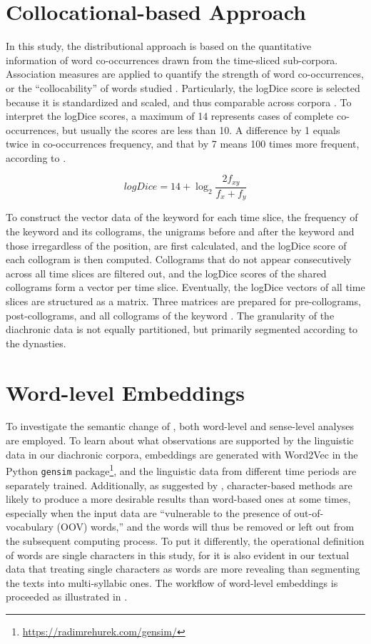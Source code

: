 \section{Collocational-based Approach}
In this study, the distributional approach is based on the quantitative information of word co-occurrences drawn from the time-sliced sub-corpora. Association measures are applied to quantify the strength of word co-occurrences, or the ``collocability'' of words studied \parencite{gablasova2017collocations}. Particularly, the logDice score is selected because it is standardized and scaled, and thus comparable across corpora \parencite{rychly2008lexicographer,gablasova2017collocations}. To interpret the logDice scores, a maximum of 14 represents cases of complete co-occurrences, but usually the scores are less than 10. A difference by 1 equals twice in co-occurrences frequency, and that by 7 means 100 times more frequent, according to .

\begin{equation}
  logDice = 14 + \log_{2}{\frac{2f_{xy}}{f_x + f_y}}
  \label{equ:logDice}
\end{equation}

To construct the vector data of the keyword \jia for each time slice, the frequency of the keyword and its collograms, the unigrams before and after the keyword and those irregardless of the position, are first calculated, and the logDice score of each collogram is then computed. Collograms that do not appear consecutively across all time slices are filtered out, and the logDice scores of the shared collograms form a vector per time slice. Eventually, the logDice vectors of all time slices are structured as a matrix. Three matrices are prepared for pre-collograms, post-collograms, and all collograms of the keyword \jia\rspace. The granularity of the diachronic data is not equally partitioned, but primarily segmented according to the dynasties.

\section{Word-level Embeddings}
To investigate the semantic change of \jia\rspace, both word-level and sense-level analyses are employed. To learn about what observations are supported by the linguistic data in our diachronic corpora, embeddings are generated with Word2Vec in the Python \texttt{gensim} package\footnote{\url{https://radimrehurek.com/gensim/}}, and the linguistic data from different time periods are separately trained. Additionally, as suggested by \textcite{li2019word}, character-based methods are likely to produce a more desirable results than word-based ones at some times, especially when the input data are ``vulnerable to the presence of out-of-vocabulary (OOV) words,'' and the words will thus be removed or left out from the subsequent computing process. To put it differently, the operational definition of words are single characters in this study, for it is also evident in our textual data that treating single characters as words are more revealing than segmenting the texts into multi-syllabic ones. The workflow of word-level embeddings is proceeded as illustrated in .

